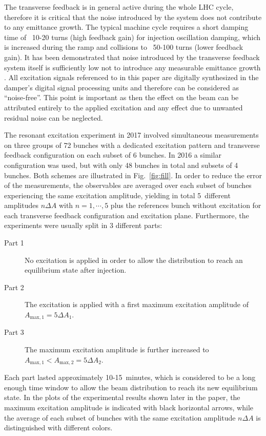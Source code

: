 \documentclass[%
 reprint,
 amsmath,amssymb,
 aps,
prstab,
longbibliography
]{revtex4-1}
\begin{document}
The transverse feedback is in general active during the whole LHC
cycle, therefore it is critical that the noise introduced by the
system does not contribute to any emittance growth. The typical
machine cycle requires a short damping time of ~10-20 turns (high
feedback gain) for injection oscillation damping, which is increased
during the ramp and collisions to ~50-100 turns (lower feedback
gain). It has been demonstrated that noise introduced by the
transverse feedback system itself is sufficiently low not to introduce
any measurable emittance growth \cite{adt_noise_emit_2017}. All
excitation signals referenced to in this paper are digitally
synthesized in the damper's digital signal processing units and
therefore can be considered as ``noise-free''. This point is important
as then the effect on the beam can be attributed entirely to the
applied excitation and any effect due to unwanted residual noise can
be neglected.

The resonant excitation experiment in 2017 involved simultaneous
measurements on three groups of 72 bunches with a dedicated excitation
pattern and transverse feedback configuration on each subset of 6
bunches. In 2016 a similar configuration was used, but with only 48
bunches in total and subsets of 4 bunches. Both schemes are
illustrated in Fig.~\ref{fig:fill}. In order to reduce the error of
the measurements, the observables are averaged over each subset of
bunches experiencing the same excitation amplitude, yielding in total
5~different amplitudes $n\Delta A$ with $n=1,\cdots, 5$ plus the
references bunch without excitation for each transverse feedback
configuration and excitation plane. Furthermore, the experiments were
usually split in 3 different parts:
\begin{description}
	\item[Part 1] No excitation is applied in order to allow the distribution to reach an equilibrium state after injection.
	\item[Part 2] The excitation is applied with a first maximum excitation amplitude of $A_{\mathrm{max,1}}=5\Delta A_1$.
	\item[Part 3] The maximum excitation amplitude is further increased to $A_{\mathrm{max,1}} < A_{\mathrm{max,2}}=5\Delta A_2$.
\end{description}
Each part lasted approximately 10-15~minutes, which is considered to
be a long enough time window to allow the beam distribution to reach
its new equilibrium state. In the plots of the experimental results
shown later in the paper, the maximum excitation amplitude is
indicated with black horizontal arrows, while the average of each
subset of bunches with the same excitation amplitude $n\Delta A$ is
distinguished with different colors.
\end{document}
